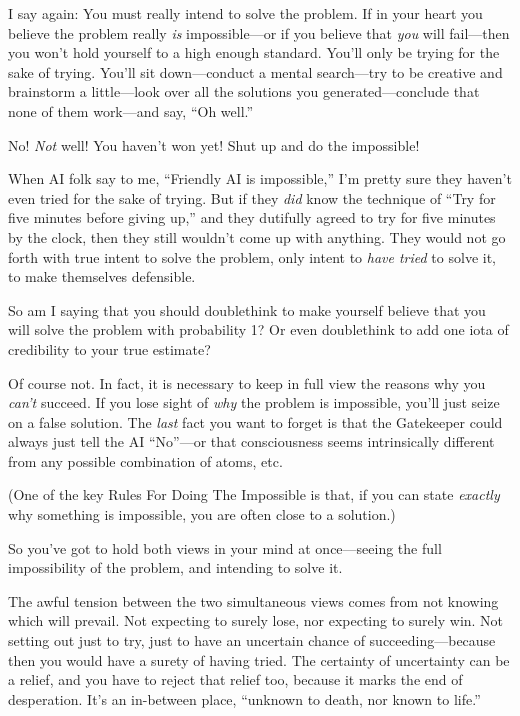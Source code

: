 {
 I say again: You must really intend to solve the problem. If in
your heart you believe the problem really \textit{is} impossible---or
if you believe that \textit{you} will fail---then you
won't hold yourself to a high enough standard.
You'll only be trying for the sake of trying.
You'll sit down---conduct a mental search---try to be
creative and brainstorm a little---look over all the solutions you
generated---conclude that none of them work---and say,
``Oh well.''}

{
 No! \textit{Not} well! You haven't won yet! Shut
up and do the impossible!}

{
 When AI folk say to me, ``Friendly AI is
impossible,'' I'm pretty sure they
haven't even tried for the sake of trying. But if they
\textit{did} know the technique of ``Try for five
minutes before giving up,'' and they dutifully agreed
to try for five minutes by the clock, then they still
wouldn't come up with anything. They would not go forth
with true intent to solve the problem, only intent to \textit{have
tried} to solve it, to make themselves defensible.}

{
 So am I saying that you should doublethink to make yourself
believe that you will solve the problem with probability 1? Or even
doublethink to add one iota of credibility to your true estimate?}

{
 Of course not. In fact, it is necessary to keep in full view the
reasons why you \textit{can't} succeed. If you lose
sight of \textit{why} the problem is impossible, you'll
just seize on a false solution. The \textit{last} fact you want to
forget is that the Gatekeeper could always just tell the AI
``No''---or that consciousness seems
intrinsically different from any possible combination of atoms, etc.}

{
 (One of the key Rules For Doing The Impossible is that, if you can
state \textit{exactly} why something is impossible, you are often close
to a solution.)}

{
 So you've got to hold both views in your mind at
once---seeing the full impossibility of the problem, and intending to
solve it.}

{
 The awful tension between the two simultaneous views comes from
not knowing which will prevail. Not expecting to surely lose, nor
expecting to surely win. Not setting out just to try, just to have an
uncertain chance of succeeding---because then you would have a surety
of having tried. The certainty of uncertainty can be a relief, and you
have to reject that relief too, because it marks the end of
desperation. It's an in-between place,
``unknown to death, nor known to
life.''}

